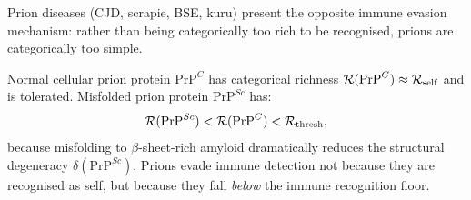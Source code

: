 Prion diseases (CJD, scrapie, BSE, kuru) present the opposite immune evasion
mechanism: rather than being categorically too rich to be recognised, prions
are categorically too simple.

\begin{theorem}
\label{thm:prion_evasion}
Normal cellular prion protein $\mathrm{PrP}^C$ has categorical richness
$\mathcal{R}(\mathrm{PrP}^C) \approx \mathcal{R}_{\mathrm{self}}$ and is tolerated.
Misfolded prion protein $\mathrm{PrP}^{Sc}$ has:
\begin{equation}
  \mathcal{R}(\mathrm{PrP}^{Sc}) < \mathcal{R}(\mathrm{PrP}^C) < \mathcal{R}_{\mathrm{thresh}},
  \label{eq:prion_richness}
\end{equation}
because misfolding to $\beta$-sheet-rich amyloid dramatically reduces the
structural degeneracy $\delta(\mathrm{PrP}^{Sc})$. Prions evade immune
detection not because they are recognised as self, but because they fall
\emph{below} the immune recognition floor.
\end{theorem}

